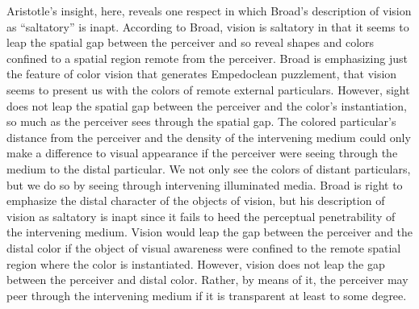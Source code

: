 Aristotle's insight, here, reveals one respect in which Broad's \citeyearpar{Broad:1952kx} description of vision as ``saltatory'' is inapt. According to Broad, vision is saltatory in that it seems to leap the spatial gap between the perceiver and so reveal shapes and colors confined to a spatial region remote from the perceiver. Broad is emphasizing just the feature of color vision that generates Empedoclean puzzlement, that vision seems to present us with the colors of remote external particulars. However, sight does not leap the spatial gap between the perceiver and the color's instantiation, so much as the perceiver sees through the spatial gap. The colored particular's distance from the perceiver and the density of the intervening medium could only make a difference to visual appearance if the perceiver were seeing through the medium to the distal particular. We not only see the colors of distant particulars, but we do so by seeing through intervening illuminated media. Broad is right to emphasize the distal character of the objects of vision, but his description of vision as saltatory is inapt since it fails to heed the perceptual penetrability of the intervening medium. Vision would leap the gap between the perceiver and the distal color if the object of visual awareness were confined to the remote spatial region where the color is instantiated. However, vision does not leap the gap between the perceiver and distal color. Rather, by means of it, the perceiver may peer through the intervening medium if it is transparent at least to some degree.

